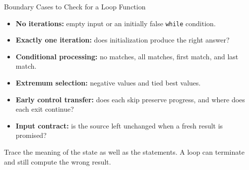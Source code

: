 \documentclass[aspectratio=169,10pt]{beamer}
\begin{document}
\begin{frame}{Boundary Cases to Check for a Loop Function}
  \begin{itemize}
    \item \textbf{No iterations:} empty input or an initially false \texttt{while} condition.
    \item \textbf{Exactly one iteration:} does initialization produce the right answer?
    \item \textbf{Conditional processing:} no matches, all matches, first match, and last match.
    \item \textbf{Extremum selection:} negative values and tied best values.
    \item \textbf{Early control transfer:} does each skip preserve progress, and where does each exit continue?
    \item \textbf{Input contract:} is the source left unchanged when a fresh result is promised?
  \end{itemize}
  \begin{keyidea}
    Trace the meaning of the state as well as the statements. A loop can terminate and still compute the wrong result.
  \end{keyidea}
\end{frame}
\end{document}
